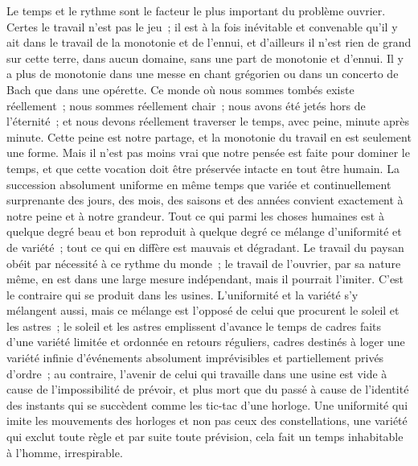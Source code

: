 \documentclass[french,twoside]{book} %
\begin{document}
Le temps et le rythme sont le facteur le plus important du problème ouvrier. Certes le travail n'est pas le jeu ; il est à la fois inévitable et convenable qu'il y ait dans le travail de la monotonie et de l'ennui, et d'ailleurs il n'est rien de grand sur cette terre, dans aucun domaine, sans une part de monotonie et d'ennui. Il y a plus de monotonie dans une messe en chant grégorien ou dans un concerto de Bach que dans une opérette. Ce monde où nous sommes tombés existe réellement ; nous sommes réellement chair ; nous avons été jetés hors de l'éternité ; et nous devons réellement traverser le temps, avec peine, minute après minute. Cette peine est notre partage, et la monotonie du travail en est seulement une forme. Mais il n'est pas moins vrai que notre pensée est faite pour dominer le temps, et que cette vocation doit être préservée intacte en tout être humain. La succession absolument uniforme en même temps que variée et continuellement surprenante des jours, des mois, des saisons et des années convient exactement à notre peine et à notre grandeur. Tout ce qui parmi les choses humaines est à quelque degré beau et bon reproduit à quelque degré ce mélange d'uniformité et de variété ; tout ce qui en diffère est mauvais et dégradant. Le travail du paysan obéit par nécessité à ce rythme du monde ; le travail de l'ouvrier, par sa nature même, en est dans une large mesure indépendant, mais il pourrait l'imiter. C'est le contraire qui se produit dans les usines. L'uniformité et la variété s'y mélangent aussi, mais ce mélange est l'opposé de celui que procurent le soleil et les astres ; le soleil et les astres emplissent d'avance le temps de cadres faits d'une variété limitée et ordonnée en retours réguliers, cadres destinés à loger une variété infinie d'événements absolument imprévisibles et partiellement privés d'ordre ; au contraire, l'avenir de celui qui travaille dans une usine est vide à cause de l'impossibilité de prévoir, et plus mort que du passé à cause de l'identité des instants qui se succèdent comme les tic-tac d'une horloge. Une uniformité qui imite les mouvements des horloges et non pas ceux des constellations, une variété qui exclut toute règle et par suite toute prévision, cela fait un temps inhabitable à l'homme, irrespirable.\par
\end{document}
